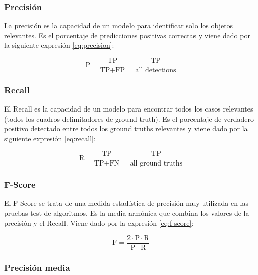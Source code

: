 \subsubsection{Precisión}
\label{subsubsec:precision}

La precisión es la capacidad de un modelo para identificar solo los objetos relevantes. Es el porcentaje de predicciones positivas correctas y viene dado por la siguiente expresión \ref{eq:precision}:

\begin{equation}
\label{eq:precision}
\text{P} = \frac{\text{TP}}{\text{TP}+\text{FP}}=\frac{\text{TP}}{\text{all detections}}
\end{equation}

\subsubsection{Recall}
\label{subsubsec:recall}

El Recall es la capacidad de un modelo para encontrar todos los casos relevantes (todos los cuadros delimitadores de ground truth). Es el porcentaje de verdadero positivo detectado entre todos los ground truths relevantes y viene dado por la siguiente expresión \ref{eq:recall}:

\begin{equation}
\label{eq:recall}
\text{R} = \frac{\text{TP}}{\text{TP}+\text{FN}}=\frac{\text{TP}}{\text{all ground truths}}
\end{equation}

\subsubsection{F-Score}
\label{subsubsec:f-score}

 El F-Score se trata de una medida estadística de precisión muy utilizada en las pruebas test de algoritmos. Es la media armónica que combina los valores de la precisión y el Recall. Viene dado por la expresión \ref{eq:f-score}:

\begin{equation}
\label{eq:f-score}
\text{F} = \frac{2 \cdotp \text{P} \cdotp \text{R}}{\text{P}+\text{R}}
\end{equation}

\subsubsection{Precisión media}
\label{subsubsec:averageprecision}

